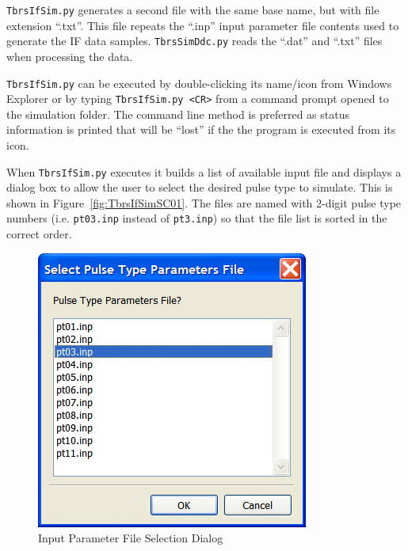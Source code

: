 \documentclass[12pt,english]{article}
\begin{document}
\texttt{TbrsIfSim.py} generates a second file with the same base name,
but with file extension ``.txt''. This file repeats the ``.inp'' input
parameter file contents used to generate the IF data samples.
\texttt{TbrsSimDdc.py} reads the ``.dat'' and ``.txt'' files when
processing the data.

\texttt{TbrsIfSim.py} can be executed by double-clicking its name/icon
from Windows Explorer or by typing \texttt{TbrsIfSim.py <CR>} from a
command prompt opened to the simulation folder. The command line
method is preferred as status information is printed that will be
``lost'' if the the program is executed from its icon.

When \texttt{TbrsIfSim.py} executes it builds a list of available
input file and displays a dialog box to allow the user to select the
desired pulse type to simulate. This is shown in
Figure~\vref{fig:TbrsIfSimSC01}.  The files are named with 2-digit
pulse type numbers (i.e.  \texttt{pt03.inp} instead of
\texttt{pt3.inp}) so that the file list is sorted in the correct
order.
\begin{figure}[ht]
  \noindent \begin{centering}
  \includegraphics{TbrsIfSimSC01.png}\medskip{}
  \caption{Input Parameter File Selection Dialog}
  \label{fig:TbrsIfSimSC01}
  \par \end{centering}
\end{figure}
\end{document}
